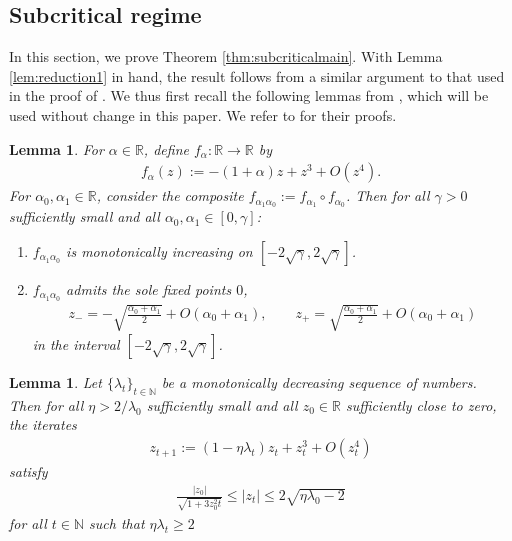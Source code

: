 \documentclass{article}
\newcommand{\RB}{\mathbb{R}}
\newcommand{\NB}{\mathbb{N}}
\theoremstyle{plain}
\newtheorem{lemma}[theorem]{Lemma}
\theoremstyle{definition}
\theoremstyle{remark}
\begin{document}
\subsection{Subcritical regime}\label{subsec:subcriticalappendix}

In this section, we prove Theorem \ref{thm:subcriticalmain}. With Lemma \ref{lem:reduction1} in hand, the result follows from a similar argument to that used in the proof of \cite[Theorem D.4]{macdonaldeos}. We thus first recall the following lemmas from \cite{macdonaldeos}, which will be used without change in this paper. We refer to \cite{macdonaldeos} for their proofs.

\begin{lemma}\cite[Lemma D.2]{macdonaldeos}\label{lem:contraction1}
    For $\alpha\in\RB$, define $f_{\alpha}:\RB\rightarrow\RB$ by
    \begin{align}
        f_{\alpha}(z):=-(1+\alpha)z+z^3+O(z^4).
    \end{align}
    For $\alpha_0,\alpha_1\in\RB$, consider the composite $f_{\alpha_1\alpha_0}:=f_{\alpha_1}\circ f_{\alpha_0}$. Then for all $\gamma>0$ sufficiently small and all $\alpha_0,\alpha_1\in[0,\gamma]$:
    \begin{enumerate}
        \item $f_{\alpha_1\alpha_0}$ is monotonically increasing on $[-2\sqrt{\gamma},2\sqrt{\gamma}]$.
        \item $f_{\alpha_1\alpha_0}$ admits the sole fixed points $0$,
        \begin{align}
            z_- = -\sqrt{\frac{\alpha_0+\alpha_1}{2}} + O(\alpha_0+\alpha_1),\qquad z_+ = \sqrt{\frac{\alpha_0+\alpha_1}{2}} + O(\alpha_0+\alpha_1)
        \end{align}
        in the interval $[-2\sqrt{\gamma},2\sqrt{\gamma}]$.
    \end{enumerate}
\end{lemma}

\begin{lemma}\cite[Lemma D.3]{macdonaldeos}\label{lem:contraction2}
    Let $\{\lambda_t\}_{t\in\NB}$ be a monotonically decreasing sequence of numbers. Then for all $\eta>2/\lambda_0$ sufficiently small and all $z_0\in\RB$ sufficiently close to zero, the iterates
    \begin{align}
    z_{t+1}:=(1-\eta\lambda_t)z_t + z_t^3 + O(z_t^4)
    \end{align}
    satisfy
    \begin{align}
    \frac{|z_0|}{\sqrt{1+3z_0^2t}}\leq |z_t|\leq 2\sqrt{\eta\lambda_0-2}
    \end{align}
    for all $t\in\NB$ such that $\eta\lambda_t\geq 2$
\end{lemma}
\end{document}
